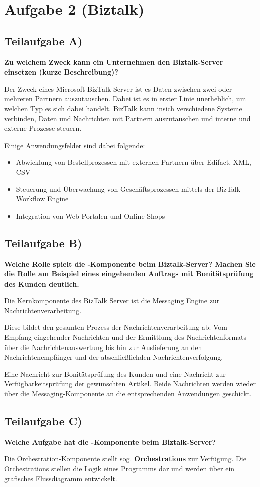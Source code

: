 \section{Aufgabe 2 (Biztalk)}

\subsection{Teilaufgabe A)}
\textbf{Zu welchem Zweck kann ein Unternehmen den Biztalk-Server einsetzen (kurze
Beschreibung)?}

Der Zweck eines Microsoft BizTalk Server ist es Daten zwischen zwei oder
mehreren Partnern auszutauschen. Dabei ist es in erster Linie unerheblich, um
welchen Typ es sich dabei handelt. BizTalk kann insich verschiedene Systeme
verbinden, Daten und Nachrichten mit Partnern auszutauschen und interne und
externe Prozesse steuern.

Einige Anwendungsfelder sind dabei folgende:
\begin{itemize}
  \item Abwicklung von Bestellprozessen mit externen Partnern über Edifact, XML,
  CSV
  \item Steuerung und Überwachung von Geschäftsprozessen mittels der BizTalk
  Workflow Engine
  \item Integration von Web-Portalen und Online-Shops
\end{itemize}

\subsection{Teilaufgabe B)}
\textbf{Welche Rolle spielt die -Komponente beim Biztalk-Server?
Machen Sie die Rolle am Beispiel eines eingehenden Auftrags mit Bonitätsprüfung des Kunden
deutlich.}

Die Kernkomponente des BizTalk Server ist die Messaging Engine zur
Nachrichtenverarbeitung. 

Diese bildet den gesamten Prozess der Nachrichtenverarbeitung ab: Vom Empfang
eingehender Nachrichten und der Ermittlung des Nachrichtenformats über die
Nachrichtenauswertung bis hin zur Auslieferung an den Nachrichtenempfänger und
der abschließlichden Nachrichtenverfolgung.

Eine Nachricht zur Bonitätsprüfung des Kunden und eine Nachricht zur
Verfügbarkeitsprüfung der gewünschten Artikel. Beide Nachrichten werden wieder
über die Messaging-Komponente an die entsprechenden Anwendungen geschickt.

\clearpage
\subsection{Teilaufgabe C)}
\textbf{Welche Aufgabe hat die -Komponente beim
Biztalk-Server?}

Die Orchestration-Komponente stellt sog. \textbf{Orchestrations} zur Verfügung.
Die Orchestrations stellen die Logik eines Programms dar und werden über ein
grafisches Flussdiagramm entwickelt.

\clearpage